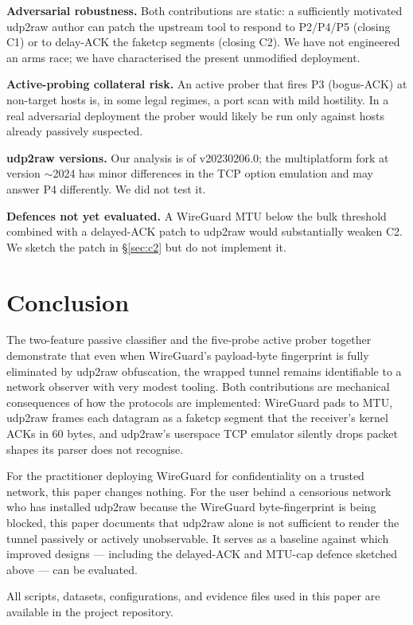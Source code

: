 \documentclass[conference]{IEEEtran}
\begin{document}
\textbf{Adversarial robustness.} Both contributions are static: a
sufficiently motivated udp2raw author can patch the upstream tool to
respond to P2/P4/P5 (closing C1) or to delay-ACK the faketcp segments
(closing C2). We have not engineered an arms race; we have characterised
the present unmodified deployment.

\textbf{Active-probing collateral risk.} An active prober that fires P3
(bogus-ACK) at non-target hosts is, in some legal regimes, a port
scan with mild hostility. In a real adversarial deployment the prober
would likely be run only against hosts already passively suspected.

\textbf{udp2raw versions.} Our analysis is of v20230206.0; the
multiplatform fork at version $\sim$2024 has minor differences in the
TCP option emulation and may answer P4 differently. We did not test it.

\textbf{Defences not yet evaluated.} A WireGuard MTU below the bulk
threshold combined with a delayed-ACK patch to udp2raw would substantially
weaken C2. We sketch the patch in \S\ref{sec:c2} but do not implement it.

\section{Conclusion}
\label{sec:conclusion}

The two-feature passive classifier and the five-probe active prober
together demonstrate that even when WireGuard's payload-byte fingerprint
is fully eliminated by udp2raw obfuscation, the wrapped tunnel remains
identifiable to a network observer with very modest tooling. Both
contributions are mechanical consequences of how the protocols are
implemented: WireGuard pads to MTU, udp2raw frames each datagram as a
faketcp segment that the receiver's kernel ACKs in 60 bytes, and udp2raw's
userspace TCP emulator silently drops packet shapes its parser does not
recognise.

For the practitioner deploying WireGuard for confidentiality on a trusted
network, this paper changes nothing. For the user behind a censorious
network who has installed udp2raw because the WireGuard byte-fingerprint
is being blocked, this paper documents that udp2raw alone is not sufficient
to render the tunnel passively or actively unobservable. It serves as a
baseline against which improved designs --- including the delayed-ACK and
MTU-cap defence sketched above --- can be evaluated.

All scripts, datasets, configurations, and evidence files used in this
paper are available in the project repository.
\end{document}

